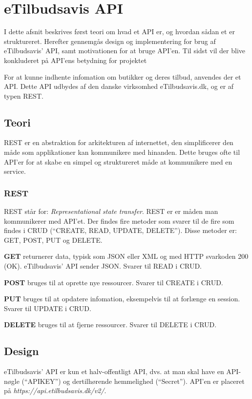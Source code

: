 \section{eTilbudsavis API}\label{api}
I dette afsnit beskrives først teori om hvad et API er, og hvordan sådan et er struktureret.
Herefter gennemgås design og implementering for brug af eTilbudsavis' API, samt motivationen for at bruge API'en. Til sidst vil der blive konkluderet på API'ens betydning for projektet

For at kunne indhente infomation om butikker og deres tilbud, anvendes der et API.
Dette API udbydes af den danske virksomhed eTilbudsavis.dk, og er af typen REST.

\subsection{Teori}
REST er en abstraktion for arkitekturen af internettet, den simplificerer den måde som applikationer kan kommunikere med hinanden.
Dette bruges ofte til API'er for at skabe en simpel og struktureret måde at kommunikere med en service\citep{REST}.

\subsubsection{REST}
REST står for: \textit{Representational state transfer}.
REST er er måden man kommunikerer med API'et.
Der findes fire metoder som svarer til de fire som findes i CRUD (``CREATE, READ, UPDATE, DELETE'').
Disse metoder er: GET, POST, PUT og DELETE.

\textbf{GET}
returnerer data, typisk som JSON eller XML og med HTTP svarkoden 200 (OK).
eTilbudsavis' API sender JSON.
Svarer til READ i CRUD.

\textbf{POST}
bruges til at oprette nye ressourcer.
Svarer til CREATE i CRUD.

\textbf{PUT}
bruges til at opdatere infomation, eksempelvis til at forlænge en session.
Svarer til UPDATE i CRUD.

\textbf{DELETE}
bruges til at fjerne ressourcer.
Svarer til DELETE i CRUD.

\subsection{Design}
eTilbudsavis' API er kun et halv-offentligt API, dvs. at man skal have en API-nøgle (``APIKEY'') og dertilhørende hemmelighed (``Secret'').
API'en er placeret på \textit{https://api.etilbudsavis.dk/v2/}. \citep{eTilAPI}

